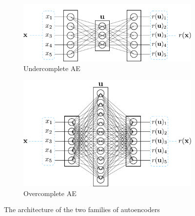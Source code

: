 \begin{figure}[!h]
\centering
\begin{subfigure}{.5\textwidth}
\vspace*{12mm}
  \centering
  \includegraphics[width=.95\linewidth]{figures/autoencoder-undercomplete}
  \vspace*{8mm}
  \caption{Undercomplete AE}
  \label{fig:undercomplete-ae}
\end{subfigure}%
\begin{subfigure}{.5\textwidth}
  \centering
  \includegraphics[width=.95\linewidth]{figures/autoencoder-overcomplete}
  \caption{Overcomplete AE}
  \label{fig:overcomplete-ae}
\end{subfigure}
\caption{The architecture of the two families of autoencoders}
\label{fig:under-over-ae}
\end{figure}

